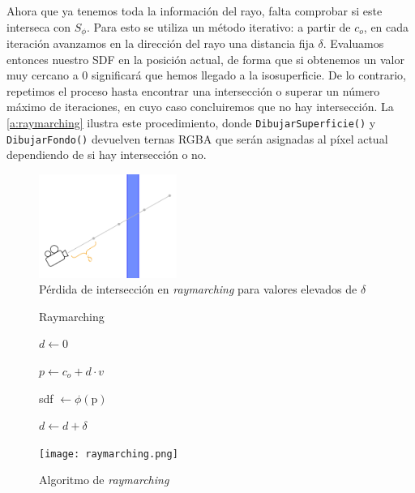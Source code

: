 Ahora que ya tenemos toda la información del rayo, falta comprobar si este interseca con $S_{\phi}$. Para esto se utiliza un método iterativo: a partir de $c_o$, en cada iteración avanzamos en la dirección del rayo una distancia fija $\delta$. Evaluamos entonces nuestro SDF en la posición actual, de forma que si obtenemos un valor muy cercano a $0$ significará que hemos llegado a la isosuperficie. De lo contrario, repetimos el proceso hasta encontrar una intersección o superar un número máximo de iteraciones, en cuyo caso concluiremos que no hay intersección. La \autoref{a:raymarching} ilustra este procedimiento, donde \texttt{DibujarSuperficie()} y \texttt{DibujarFondo()} devuelven ternas RGBA que serán asignadas al píxel actual dependiendo de si hay intersección o no.\newline

\begin{figure}[ht!]
    \centering
    \includegraphics[width=0.4\textwidth]{Plantilla-TFG-master/img/miss.png}
    \caption{Pérdida de intersección en \textit{raymarching} para valores elevados de $\delta$}
    \label{fig:miss}
\end{figure}

\begin{figure}[ht!]
    \centering
    \begin{minipage}{0.50\textwidth}
        \begin{algorithm}[H]
            \caption{Raymarching}
                
                $d \gets 0$ 
                
                 {
                    $p \gets c_o +d\cdot v$
                    
                    sdf $\gets \phi(\text{p})$
                    
            
                    $d\gets d + \delta$\;
            
                }
        \end{algorithm}
    \end{minipage}%
    \hfill
    \begin{minipage}{0.48\textwidth}
        \texttt{[image: raymarching.png]}
    \end{minipage}
    \caption{Algoritmo de \textit{raymarching}}
    \label{a:raymarching}
\end{figure}

